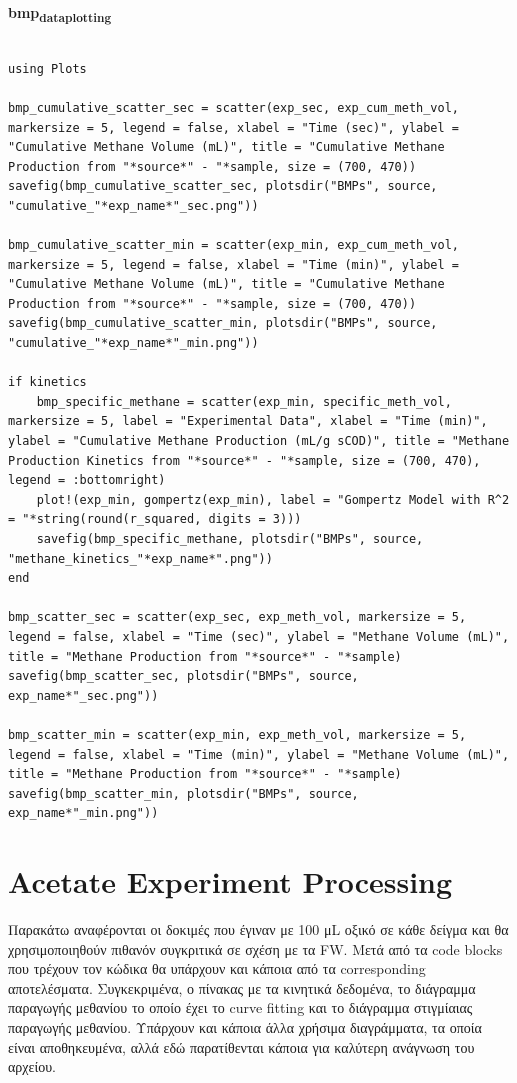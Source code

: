 \documentclass[11pt]{article}
\begin{document}
\textbf{bmp\textsubscript{data}\textsubscript{plotting}}
\begin{verbatim}

using Plots

bmp_cumulative_scatter_sec = scatter(exp_sec, exp_cum_meth_vol, markersize = 5, legend = false, xlabel = "Time (sec)", ylabel = "Cumulative Methane Volume (mL)", title = "Cumulative Methane Production from "*source*" - "*sample, size = (700, 470))
savefig(bmp_cumulative_scatter_sec, plotsdir("BMPs", source, "cumulative_"*exp_name*"_sec.png"))

bmp_cumulative_scatter_min = scatter(exp_min, exp_cum_meth_vol, markersize = 5, legend = false, xlabel = "Time (min)", ylabel = "Cumulative Methane Volume (mL)", title = "Cumulative Methane Production from "*source*" - "*sample, size = (700, 470))
savefig(bmp_cumulative_scatter_min, plotsdir("BMPs", source, "cumulative_"*exp_name*"_min.png"))

if kinetics
    bmp_specific_methane = scatter(exp_min, specific_meth_vol, markersize = 5, label = "Experimental Data", xlabel = "Time (min)", ylabel = "Cumulative Methane Production (mL/g sCOD)", title = "Methane Production Kinetics from "*source*" - "*sample, size = (700, 470), legend = :bottomright)
    plot!(exp_min, gompertz(exp_min), label = "Gompertz Model with R^2 = "*string(round(r_squared, digits = 3)))
    savefig(bmp_specific_methane, plotsdir("BMPs", source, "methane_kinetics_"*exp_name*".png"))
end

bmp_scatter_sec = scatter(exp_sec, exp_meth_vol, markersize = 5, legend = false, xlabel = "Time (sec)", ylabel = "Methane Volume (mL)", title = "Methane Production from "*source*" - "*sample)
savefig(bmp_scatter_sec, plotsdir("BMPs", source, exp_name*"_sec.png"))

bmp_scatter_min = scatter(exp_min, exp_meth_vol, markersize = 5, legend = false, xlabel = "Time (min)", ylabel = "Methane Volume (mL)", title = "Methane Production from "*source*" - "*sample)
savefig(bmp_scatter_min, plotsdir("BMPs", source, exp_name*"_min.png"))

\end{verbatim}

\section{Acetate Experiment Processing}
\label{sec:orga521951}
Παρακάτω αναφέρονται οι δοκιμές που έγιναν με 100 μL οξικό σε κάθε δείγμα και θα χρησιμοποιηθούν πιθανόν συγκριτικά σε σχέση με τα FW. Μετά από τα code blocks που τρέχουν τον κώδικα θα υπάρχουν και κάποια από τα corresponding αποτελέσματα. Συγκεκριμένα, ο πίνακας με τα κινητικά δεδομένα, το διάγραμμα παραγωγής μεθανίου το οποίο έχει το curve fitting και το διάγραμμα στιγμίαιας παραγωγής μεθανίου. Υπάρχουν και κάποια άλλα χρήσιμα διαγράμματα, τα οποία είναι αποθηκευμένα, αλλά εδώ παρατίθενται κάποια για καλύτερη ανάγνωση του αρχείου.
\end{document}
